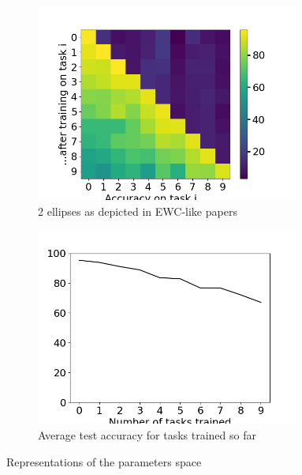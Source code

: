 \documentclass[twocolumn]{article}
\begin{document}
\begin{figure}
    \centering
    \begin{subfigure}[b]{0.35\textwidth}
        \centering
        \includegraphics[width=0.95\textwidth]{images/accs_matrix_greedy_HPO_GroHess_from_output_pMNIST_via_torch_standard_2024-07-16_20-41-35.png}
        \caption{2 ellipses as depicted in EWC-like papers}
        \label{fig:test_accs_matrix}
    \end{subfigure}
    \hspace{-0mm}
    \begin{subfigure}[b]{0.35\textwidth}
        \centering
        \includegraphics[width=0.95\textwidth]{images/avg_acc_curve_greedy_HPO_GroHess_from_output_pMNIST_via_torch_standard_2024-07-16_20-41-35.png}
        \caption{Average test accuracy for tasks trained so far}
        \label{fig:classic_plot}
    \end{subfigure}
    \caption{Representations of the parameters space}
\end{figure}
\end{document}
